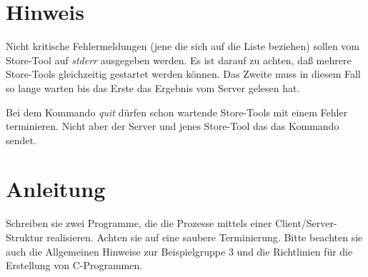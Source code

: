 \documentclass{article}
\begin{document}
\section*{Hinweis}
Nicht kritische Fehlermeldungen (jene die sich auf die Liste beziehen) sollen vom Store-Tool auf \emph{stderr} ausgegeben werden. Es ist darauf zu achten, daß mehrere Store-Tools gleichzeitig gestartet werden können. Das Zweite muss in diesem Fall so lange warten bis das Erste das Ergebnis vom Server gelesen hat.

Bei dem Kommando \emph{quit} dürfen schon wartende Store-Tools mit einem Fehler terminieren. Nicht aber der Server und jenes Store-Tool das das Kommando sendet.

\section*{Anleitung}
Schreiben sie zwei Programme, die die Prozesse mittels einer Client/Server-Struktur realisieren. Achten sie auf eine saubere Terminierung. Bitte beachten sie auch die Allgemeinen Hinweise zur Beispielgruppe 3 und die Richtlinien
für die Erstellung von C-Programmen.
\end{document}
